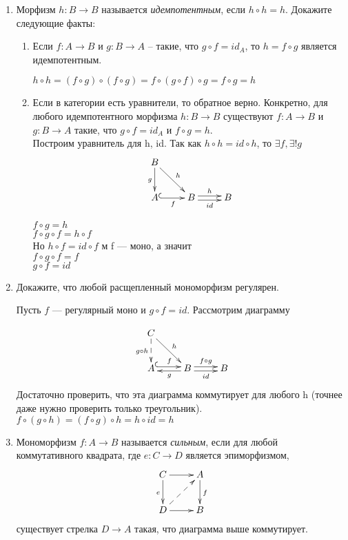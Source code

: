 \documentclass[draft]{article}
\begin{document}
\begin{enumerate}
\item Морфизм $h : B \to B$ называется \emph{идемпотентным}, если $h \circ h = h$.
Докажите следующие факты:
\begin{enumerate}
\item Если $f : A \to B$ и $g : B \to A$ -- такие, что $g \circ f = id_A$, то $h = f \circ g$ является идемпотентным. 

$h \circ h = (f \circ g)\circ (f\circ g) = f \circ (g\circ f)\circ g = f \circ g = h$
\item Если в категории есть уравнители, то обратное верно.
Конкретно, для любого идемпотентного морфизма $h : B \to B$ существуют $f : A \to B$ и $g : B \to A$ такие, что $g \circ f = id_A$ и $f \circ g = h$.\\

Построим уравнитель для h, id. Так как $h \circ h = id \circ h$, то $\exists f, \exists!g$
\[ \xymatrix{ B \ar[dr]^{h}\ar[d]_g & & \\
              A \ar@{^{(}->}[r]_f & B \ar@<-.5ex>[r]_{id}\ar@<.5ex>[r]^{h} & B
            } \]

$f \circ g = h$\\
$f \circ g \circ f = h \circ f$\\
Но $h \circ f = id \circ f$ м f --- моно, а значит\\
$f \circ g \circ f = f$\\
$g \circ f = id$

\end{enumerate}

\item Докажите, что любой расщепленный мономорфизм регулярен.

Пусть  $f$ --- регулярный моно и $g\circ f = id$. Рассмотрим диаграмму

\[ \xymatrix{ C \ar[dr]^{h}\ar@{-->}[d]_{g\circ h} & & \\
              A \ar@{^{(}->}@<.5ex>[r]^f & B \ar@<.5ex>[l]^g \ar@<-.5ex>[r]_{id}\ar@<.5ex>[r]^{f\circ g} & B
            } \]
Достаточно проверить, что эта диаграмма коммутирует для любого h (точнее даже нужно проверить только треугольник).\\
$f\circ (g\circ h) = (f \circ g) \circ h = h \circ id = h$

\item Мономорфизм $f : A \to B$ называется \emph{сильным}, если для любой коммутативного квадрата, где $e : C \to D$ является эпиморфизмом,
\[ \xymatrix{ C \ar[r] \ar[d]_e      & A \ar[d]^f \\
              D \ar[r] \ar@{-->}[ur] & B
            } \]
существует стрелка $D \to A$ такая, что диаграмма выше коммутирует.


\end{enumerate}
\end{document}
